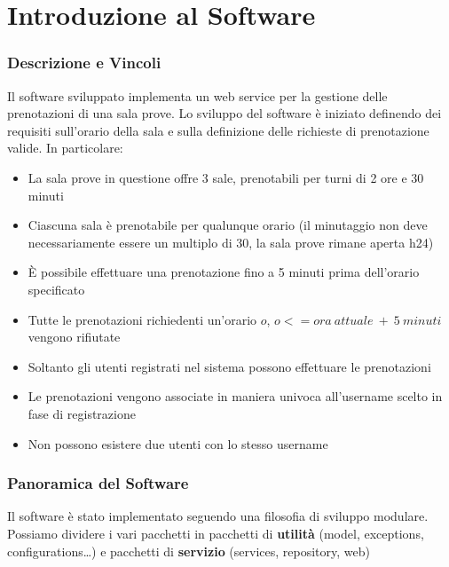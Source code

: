 \chapter{Introduzione al Software}

\subsection{Descrizione e Vincoli}

Il software sviluppato implementa un web service per la gestione delle prenotazioni di una sala prove.\newline
Lo sviluppo del software è iniziato definendo dei requisiti sull'orario della sala e sulla definizione delle richieste di prenotazione valide. In particolare:

\begin{itemize}
	\item La sala prove in questione offre 3 sale, prenotabili per turni di 2 ore e 30 minuti
	\item Ciascuna sala è prenotabile per qualunque orario (il minutaggio non deve necessariamente essere un multiplo di 30, la sala prove rimane aperta h24)
	\item È possibile effettuare una prenotazione fino a 5 minuti prima dell'orario specificato
	\item Tutte le prenotazioni richiedenti un'orario $o$, $o <= ora\ attuale\ +\ 5\ minuti$ vengono rifiutate
	\item Soltanto gli utenti registrati nel sistema possono effettuare le prenotazioni
	\item Le prenotazioni vengono associate in maniera univoca all'username scelto in fase di registrazione
	\item Non possono esistere due utenti con lo stesso username
\end{itemize}

\subsection{Panoramica del Software}

Il software è stato implementato seguendo una filosofia di sviluppo modulare. Possiamo dividere i vari pacchetti in pacchetti di \textbf{utilità} (model, exceptions, configurations\dots) e pacchetti di \textbf{servizio} (services, repository, web)


